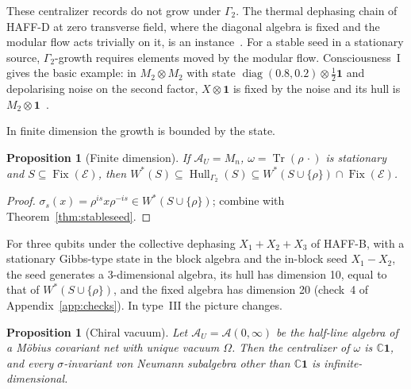 \documentclass[12pt]{article}
\newtheorem{proposition}[theorem]{Proposition}
\theoremstyle{definition}
\theoremstyle{remark}
\newcommand{\Fix}{\operatorname{Fix}}
\newcommand{\Hull}{\operatorname{Hull}}
\newcommand{\AU}{\mathcal A_U}
\begin{document}
These centralizer records do not grow under \(\Gamma_2\). The thermal dephasing chain of HAFF-D at zero
transverse field, where the diagonal algebra is fixed and the modular flow acts
trivially on it, is an instance~\cite{HAFFD}. For a stable seed in a stationary source,
\(\Gamma_2\)-growth requires elements moved by the modular flow. Consciousness~I gives the basic example: in
\(M_2\otimes M_2\) with state \(\operatorname{diag}(0.8,0.2)\otimes\frac12\mathbf 1\) and
depolarising noise on the second factor, \(X\otimes\mathbf 1\) is fixed by the noise
and its hull is \(M_2\otimes\mathbf 1\)~\cite{PaperI}.

In finite dimension the growth is bounded by the state.

\begin{proposition}[Finite dimension]\label{prop:finite}
If \(\AU=M_n\), \(\omega=\operatorname{Tr}(\rho\,\cdot)\) is stationary and
\(S\subseteq\Fix(\mathcal E)\), then
\(W^*(S)\subseteq\Hull_{\Gamma_2}(S)\subseteq W^*(S\cup\{\rho\})\cap\Fix(\mathcal E)\).
\end{proposition}

\begin{proof}
\(\sigma_s(x)=\rho^{is}x\rho^{-is}\in W^*(S\cup\{\rho\})\); combine with
Theorem~\ref{thm:stableseed}.
\end{proof}

For three qubits under the collective dephasing \(X_1+X_2+X_3\) of HAFF-B, with a
stationary Gibbs-type state in the block algebra and the in-block seed \(X_1-X_2\), the
seed generates a 3-dimensional algebra, its hull has dimension 10, equal to that of
\(W^*(S\cup\{\rho\})\), and the fixed algebra has dimension 20 (check~4 of
Appendix~\ref{app:checks}). In type~III the picture changes.

\begin{proposition}[Chiral vacuum]\label{prop:chiral}
Let \(\AU=\mathcal A(0,\infty)\) be the half-line algebra of a M\"obius covariant net
with unique vacuum \(\Omega\). Then the centralizer of \(\omega\) is \(\mathbb C\mathbf 1\),
and every \(\sigma\)-invariant von Neumann subalgebra other than \(\mathbb C\mathbf 1\) is
infinite-dimensional.
\end{proposition}
\end{document}
